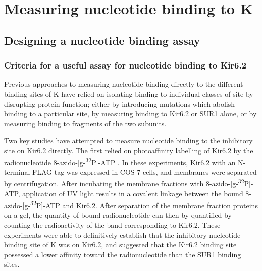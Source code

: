 \chapter{\label{ch:3}Measuring nucleotide binding to K\ATP} 

\graphicspath{{figures/ch3/}}

\minitoc

\section{Designing a nucleotide binding assay}

\subsection{Criteria for a useful assay for nucleotide binding to Kir6.2}

Previous approaches to measuring nucleotide binding directly to the different binding sites  of K\ATP{} have relied on isolating binding to individual classes of site by disrupting protein function; either by introducing mutations which abolish binding to a particular site, by measuring binding to Kir6.2 or SUR1 alone, or by measuring binding to fragments of the two subunits.

Two key studies have attempted to measure nucleotide binding to the inhibitory site on Kir6.2 directly.
The first relied on photoaffinity labelling of Kir6.2 by the radionucleotide 8-azido-[\textgreek{g}-\textsuperscript{32}P]-ATP \cite{tanabe_direct_1999}.
In these experiments, Kir6.2 with an N-terminal FLAG-tag was expressed in COS-7 cells, and membranes were separated by centrifugation.
After incubating the membrane fractions with 8-azido-[\textgreek{g}-\textsuperscript{32}P]-ATP, application of UV light results in a covalent linkage between the bound 8-azido-[\textgreek{g}-\textsuperscript{32}P]-ATP and Kir6.2.
After separation of the membrane fraction proteins on a gel, the quantity of bound radionucleotide can then by quantified by counting the radioactivity of the band corresponding to Kir6.2.
These experiments were able to definitively establish that the inhibitory nucleotide binding site of K\ATP{} was on Kir6.2, and suggested that the Kir6.2 binding site possessed a lower affinity toward the radionucleotide than the SUR1 binding sites.

